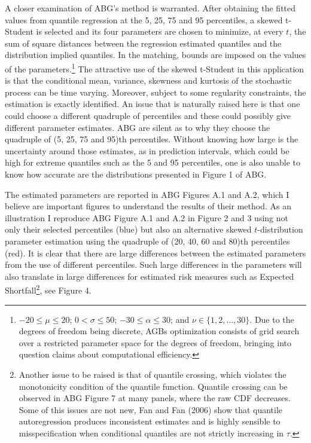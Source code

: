 \documentclass[
  11pt,
]{article}
\begin{document}
A closer examination of ABG's method is warranted. After obtaining the
fitted values from quantile regression at the 5, 25, 75 and 95
percentiles, a skewed t-Student is selected and its four parameters are
chosen to minimize, at every \(t\), the sum of square distances between
the regression estimated quantiles and the distribution implied
quantiles. In the matching, bounds are imposed on the values of the
parameters.\footnote{$-20 \leq \mu \leq 20$; $0 < \sigma \leq 50$; $-30 \leq \alpha \leq 30$; and $\nu \in \{1,2, \dots,30\}$. Due to the degrees of freedom being discrete, AGBs optimization consists of grid search over a restricted parameter space for the degrees of freedom, bringing into question claims about computational efficiency.}
The attractive use of the skewed t-Student in this application is that
the conditional mean, variance, skewness and kurtosis of the stochastic
process can be time varying. Moreover, subject to some regularity
constraints, the estimation is exactly identified. An issue that is
naturally raised here is that one could choose a different quadruple of
percentiles and these could possibly give different parameter estimates.
ABG are silent as to why they choose the quadruple of (5, 25, 75 and
95)th percentiles. Without knowing how large is the uncertainty around
those estimates, as in prediction intervals, which could be high for
extreme quantiles such as the 5 and 95 percentiles, one is also unable
to know how accurate are the distributions presented in Figure 1 of ABG.

The estimated parameters are reported in ABG Figures A.1 and A.2, which
I believe are important figures to understand the results of their
method. As an illustration I reproduce ABG Figure A.1 and A.2 in Figure
2 and 3 using not only their selected percentiles (blue) but also an
alternative skewed \(t\)-distribution parameter estimation using the
quadruple of (20, 40, 60 and 80)th percentiles (red). It is clear that
there are large differences between the estimated parameters from the
use of different percentiles. Such large differences in the parameters
will also translate in large differences for estimated risk measures
such as Expected
Shortfall\footnote{Another issue to be raised is that of quantile crossing, which violates the monotonicity condition of the quantile function. Quantile crossing can be observed in ABG Figure 7 at many panels, where the raw CDF decreases. Some of this issues are not new, Fan and Fan (2006) show that quantile autoregression produces inconsistent estimates and is highly sensible to misspecification when conditional quantiles are not strictly increasing in $\tau$.},
see Figure 4.
\end{document}
